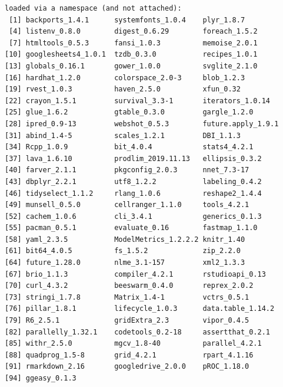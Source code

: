 \documentclass[
  12pt,
  a4paper,
  DIV=11,
  numbers=noendperiod]{scrartcl}
\begin{document}
\begin{verbatim}
loaded via a namespace (and not attached):
 [1] backports_1.4.1      systemfonts_1.0.4    plyr_1.8.7          
 [4] listenv_0.8.0        digest_0.6.29        foreach_1.5.2       
 [7] htmltools_0.5.3      fansi_1.0.3          memoise_2.0.1       
[10] googlesheets4_1.0.1  tzdb_0.3.0           recipes_1.0.1       
[13] globals_0.16.1       gower_1.0.0          svglite_2.1.0       
[16] hardhat_1.2.0        colorspace_2.0-3     blob_1.2.3          
[19] rvest_1.0.3          haven_2.5.0          xfun_0.32           
[22] crayon_1.5.1         survival_3.3-1       iterators_1.0.14    
[25] glue_1.6.2           gtable_0.3.0         gargle_1.2.0        
[28] ipred_0.9-13         webshot_0.5.3        future.apply_1.9.1  
[31] abind_1.4-5          scales_1.2.1         DBI_1.1.3           
[34] Rcpp_1.0.9           bit_4.0.4            stats4_4.2.1        
[37] lava_1.6.10          prodlim_2019.11.13   ellipsis_0.3.2      
[40] farver_2.1.1         pkgconfig_2.0.3      nnet_7.3-17         
[43] dbplyr_2.2.1         utf8_1.2.2           labeling_0.4.2      
[46] tidyselect_1.1.2     rlang_1.0.6          reshape2_1.4.4      
[49] munsell_0.5.0        cellranger_1.1.0     tools_4.2.1         
[52] cachem_1.0.6         cli_3.4.1            generics_0.1.3      
[55] pacman_0.5.1         evaluate_0.16        fastmap_1.1.0       
[58] yaml_2.3.5           ModelMetrics_1.2.2.2 knitr_1.40          
[61] bit64_4.0.5          fs_1.5.2             zip_2.2.0           
[64] future_1.28.0        nlme_3.1-157         xml2_1.3.3          
[67] brio_1.1.3           compiler_4.2.1       rstudioapi_0.13     
[70] curl_4.3.2           beeswarm_0.4.0       reprex_2.0.2        
[73] stringi_1.7.8        Matrix_1.4-1         vctrs_0.5.1         
[76] pillar_1.8.1         lifecycle_1.0.3      data.table_1.14.2   
[79] R6_2.5.1             gridExtra_2.3        vipor_0.4.5         
[82] parallelly_1.32.1    codetools_0.2-18     assertthat_0.2.1    
[85] withr_2.5.0          mgcv_1.8-40          parallel_4.2.1      
[88] quadprog_1.5-8       grid_4.2.1           rpart_4.1.16        
[91] rmarkdown_2.16       googledrive_2.0.0    pROC_1.18.0         
[94] ggeasy_0.1.3        
\end{verbatim}
\end{document}
